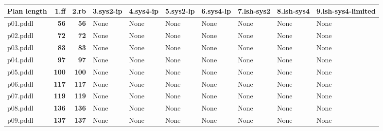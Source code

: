 \documentclass{article}
\begin{document}
\begin{tabular}{@{}lrrrrrrrrr@{}}
Plan length & 1.ff & 2.rb & 3.sys2-ip & 4.sys4-ip & 5.sys2-lp & 6.sys4-lp & 7.lsh-sys2 & 8.lsh-sys4 & 9.lsh-sys4-limited \\
\midrule
p01.pddl & \textbf{56} & \textbf{56} & \multicolumn{1}{|l|}{None} & \multicolumn{1}{|l|}{None} & \multicolumn{1}{|l|}{None} & \multicolumn{1}{|l|}{None} & \multicolumn{1}{|l|}{None} & \multicolumn{1}{|l|}{None} & \multicolumn{1}{|l|}{None} \\
p02.pddl & \textbf{72} & \textbf{72} & \multicolumn{1}{|l|}{None} & \multicolumn{1}{|l|}{None} & \multicolumn{1}{|l|}{None} & \multicolumn{1}{|l|}{None} & \multicolumn{1}{|l|}{None} & \multicolumn{1}{|l|}{None} & \multicolumn{1}{|l|}{None} \\
p03.pddl & \textbf{83} & \textbf{83} & \multicolumn{1}{|l|}{None} & \multicolumn{1}{|l|}{None} & \multicolumn{1}{|l|}{None} & \multicolumn{1}{|l|}{None} & \multicolumn{1}{|l|}{None} & \multicolumn{1}{|l|}{None} & \multicolumn{1}{|l|}{None} \\
p04.pddl & \textbf{97} & \textbf{97} & \multicolumn{1}{|l|}{None} & \multicolumn{1}{|l|}{None} & \multicolumn{1}{|l|}{None} & \multicolumn{1}{|l|}{None} & \multicolumn{1}{|l|}{None} & \multicolumn{1}{|l|}{None} & \multicolumn{1}{|l|}{None} \\
p05.pddl & \textbf{100} & \textbf{100} & \multicolumn{1}{|l|}{None} & \multicolumn{1}{|l|}{None} & \multicolumn{1}{|l|}{None} & \multicolumn{1}{|l|}{None} & \multicolumn{1}{|l|}{None} & \multicolumn{1}{|l|}{None} & \multicolumn{1}{|l|}{None} \\
p06.pddl & \textbf{117} & \textbf{117} & \multicolumn{1}{|l|}{None} & \multicolumn{1}{|l|}{None} & \multicolumn{1}{|l|}{None} & \multicolumn{1}{|l|}{None} & \multicolumn{1}{|l|}{None} & \multicolumn{1}{|l|}{None} & \multicolumn{1}{|l|}{None} \\
p07.pddl & \textbf{119} & \textbf{119} & \multicolumn{1}{|l|}{None} & \multicolumn{1}{|l|}{None} & \multicolumn{1}{|l|}{None} & \multicolumn{1}{|l|}{None} & \multicolumn{1}{|l|}{None} & \multicolumn{1}{|l|}{None} & \multicolumn{1}{|l|}{None} \\
p08.pddl & \textbf{136} & \textbf{136} & \multicolumn{1}{|l|}{None} & \multicolumn{1}{|l|}{None} & \multicolumn{1}{|l|}{None} & \multicolumn{1}{|l|}{None} & \multicolumn{1}{|l|}{None} & \multicolumn{1}{|l|}{None} & \multicolumn{1}{|l|}{None} \\
p09.pddl & \textbf{137} & \textbf{137} & \multicolumn{1}{|l|}{None} & \multicolumn{1}{|l|}{None} & \multicolumn{1}{|l|}{None} & \multicolumn{1}{|l|}{None} & \multicolumn{1}{|l|}{None} & \multicolumn{1}{|l|}{None} & \multicolumn{1}{|l|}{None} \\

\end{tabular}
\end{document}
